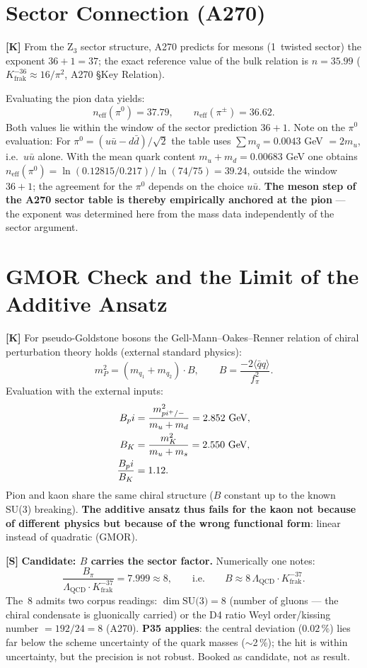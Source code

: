 \section{Sector Connection (A270)}

\textbf{[K]} From the Z$_3$ sector structure, A270 predicts for mesons
(1~twisted sector) the exponent $36+1 = 37$; the exact reference value
of the bulk relation is $n = 35{.}99$
($K_\text{frak}^{-36} \approx 16/\pi^2$, A270 \S{}Key Relation).

Evaluating the pion data yields:
\[
  n_\text{eff}(\pi^0) = 37{.}79, \qquad n_\text{eff}(\pi^\pm) = 36{.}62.
\]
Both values lie within the window of the sector prediction $36+1$.
Note on the $\pi^0$ evaluation: For $\pi^0=(u\bar u-d\bar d)/\sqrt2$ the table
uses $\sum m_q=0.0043$ GeV $=2m_u$, i.e.\ $u\bar u$ alone. With the mean quark
content $m_u+m_d=0.00683$ GeV one obtains
$n_\text{eff}(\pi^0)=\ln(0.12815/0.217)/\ln(74/75)=39.24$, outside the window
$36+1$; the agreement for the $\pi^0$ depends on the choice $u\bar u$.
\textbf{The meson step of the A270 sector table is thereby empirically
anchored at the pion} --- the exponent was determined here from the
mass data independently of the sector argument.

\section{GMOR Check and the Limit of the Additive Ansatz}

\textbf{[K]} For pseudo-Goldstone bosons the Gell-Mann--Oakes--Renner
relation of chiral perturbation theory holds (external standard
physics):
\[
  m_P^2 = (m_{q_1} + m_{q_2})\cdot B,
  \qquad B = \frac{-2\langle\bar qq\rangle}{f_\pi^2}.
\]
Evaluation with the external inputs:
\begin{align}
  B_\pi &= \frac{m_{\pi^\pm}^2}{m_u+m_d} = 2{.}852\ \text{GeV}, \notag\\
  B_K   &= \frac{m_K^2}{m_u+m_s} = 2{.}550\ \text{GeV}, \notag\\
  \frac{B_\pi}{B_K} &= 1{.}12. \notag
\end{align}
Pion and kaon share the same chiral structure ($B$ constant up to the
known SU(3) breaking). \textbf{The additive ansatz thus fails for the
kaon not because of different physics but because of the wrong
functional form}: linear instead of quadratic (GMOR).

\medskip
\textbf{[S]} \textbf{Candidate: $B$ carries the sector factor.}
Numerically one notes:
\[
  \frac{B_\pi}{\Lambda_\text{QCD}\cdot K_\text{frak}^{-37}}
  = 7{.}999 \approx 8,
  \qquad\text{i.e.}\qquad
  B \approx 8\,\Lambda_\text{QCD}\cdot K_\text{frak}^{-37}.
\]
The~8 admits two corpus readings: $\dim\text{SU(3)} = 8$ (number of
gluons --- the chiral condensate is gluonically carried) or the D4
ratio Weyl order/kissing number $= 192/24 = 8$ (A270).
\textbf{P35 applies}: the central deviation ($0{.}02\,\%$) lies far
below the scheme uncertainty of the quark masses ($\sim$2\,\%); the hit
is within uncertainty, but the precision is not robust. Booked as
candidate, not as result.

